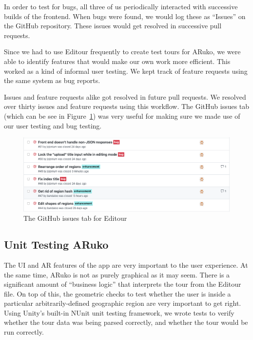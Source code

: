 \documentclass[a4paper, 10pt, american, titlepage]{article}
\begin{document}
In order to test for bugs, all three of us periodically interacted with
successive builds of the frontend. When bugs were found, we would log these as
``Issues'' on the GitHub repository. These issues would get resolved in
successive pull requests.

Since we had to use Editour frequently to create test tours for ARuko, we were
able to identify features that would make our own work more efficient. This
worked as a kind of informal user testing. We kept track of feature requests
using the same system as bug reports.

Issues and feature requests alike got resolved in future pull requests. We
resolved over thirty issues and feature requests using this workflow. The
GitHub issues tab (which can be see in Figure~\ref{fig:issuesPageExample}) was
very useful for making sure we made use of our user testing and bug testing.

\begin{figure}[h]
	\centering
	\includegraphics[width=\textwidth]{issues-page-example.png}
	\caption{The GitHub issues tab for Editour}
	\label{fig:issuesPageExample}
\end{figure}

\subsection{Unit Testing ARuko}
\label{sec:unitTestingARuko}

The UI and AR features of the app are very important to the user experience. At
the same time, ARuko is not as purely graphical as it may seem. There is a
significant amount of ``business logic'' that interprets the tour from the
Editour file. On top of this, the geometric checks to test whether the user is
inside a particular arbitrarily-defined geographic region are very important to
get right.  Using Unity's built-in NUnit unit testing framework, we wrote tests
to verify whether the tour data was being parsed correctly, and whether the tour
would be run correctly.
\end{document}
